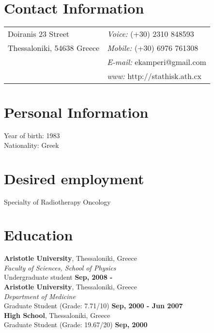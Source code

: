 \documentclass[margin,line]{res}
\begin{document}

\begin{resume}
\section{\sc Contact Information}
\vspace{.05in}
\begin{tabular}{@{}p{2in}p{4in}}
Doiranis 23 Street           & {\it Voice:}   (+30) 2310 848593 \\
Thessaloniki, 54638 Greece   & {\it Mobile:}  (+30) 6976 761308 \\
                             & {\it E-mail:}  ekamperi@gmail.com\\
                             & {\it www:} http://stathisk.ath.cx\\
\end{tabular}

\section{\sc Personal Information}
Year of birth: 1983\\
Nationality: Greek

\section{\sc Desired employment}
Specialty of Radiotherapy Oncology

\section{\sc Education}
{\bf Aristotle University}, Thessaloniki, Greece\\
{\em Faculty of Sciences, School of Physics}\\
Undergraduate student \hfill {\bf Sep, 2008 - }\\

{\bf Aristotle University}, Thessaloniki, Greece\\
{\em Department of Medicine}\\
Graduate Student (Grade: 7.71/10) \hfill {\bf Sep, 2000 - Jun 2007}\\

{\bf High School}, Thessaloniki, Greece\\
Graduate Student (Grade: 19.67/20) \hfill {\bf Sep, 2000}\\


\end{resume}
\end{document}
